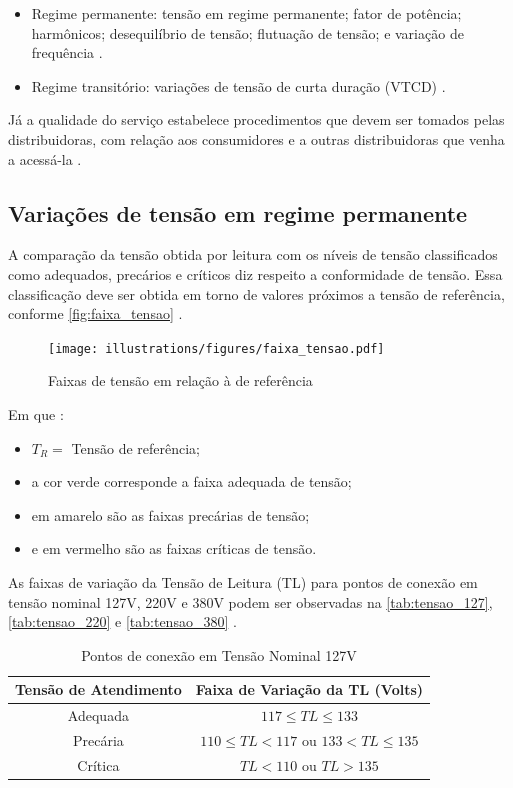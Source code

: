 \begin{itemize}
  \item Regime permanente: tensão em regime permanente; fator de potência; harmônicos; desequilíbrio de tensão; flutuação de tensão; e variação de frequência \cite{ref:ANEEL2021}.
  \item Regime transitório: variações de tensão de curta duração (VTCD) \cite{ref:ANEEL2021}.
\end{itemize}

Já a qualidade do serviço estabelece procedimentos que devem ser tomados pelas distribuidoras, com relação aos consumidores e a outras distribuidoras que venha a acessá-la \cite{ref:ANEEL2021}.

\subsection{Variações de tensão em regime permanente}

A comparação da tensão obtida por leitura com os níveis de tensão classificados como adequados, precários e críticos diz respeito a conformidade de tensão. Essa classificação deve ser obtida em torno de valores próximos a tensão de referência, conforme \autoref{fig:faixa_tensao} \cite{ref:ANEEL2021}.

\begin{figure}[H]
	\centering
	\caption{Faixas de tensão em relação à de referência}
	\label{fig:faixa_tensao}
	\texttt{[image: illustrations/figures/faixa\_tensao.pdf]}
\end{figure}

Em que \cite{ref:ANEEL2021}:

\begin{itemize}
  \item $T_R =$ Tensão de referência;
  \item a cor verde corresponde a faixa adequada de tensão;
  \item em amarelo são as faixas precárias de tensão;
  \item e em vermelho são as faixas críticas de tensão.
\end{itemize}


As faixas de variação da Tensão de Leitura (TL) para pontos de conexão em tensão nominal 127V, 220V e 380V podem ser observadas na \autoref{tab:tensao_127}, \autoref{tab:tensao_220} e \autoref{tab:tensao_380} \cite{ref:ANEEL2021}.

\begin{table}[H]
  \centering
  \caption{Pontos de conexão em Tensão Nominal 127V}
  \label{tab:tensao_127}
  \begin{tabular}{@{}cc@{}}
  \toprule
  \textbf{Tensão de Atendimento} & \textbf{Faixa de Variação da TL (Volts)} \\ \midrule
  Adequada & $117 \leq TL \leq 133$ \\
  Precária & $110 \leq TL < 117$ ou $133 < TL \leq 135$ \\
  Crítica & $TL < 110$ ou $TL > 135$ \\ \bottomrule
  \end{tabular}
\end{table}

